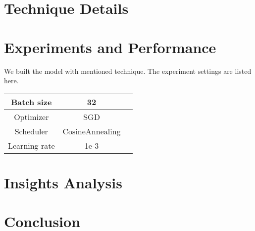 \documentclass[10pt,twocolumn,letterpaper]{article}
\begin{document}
\section{Technique Details}

\section{Experiments and Performance}

We built the model with mentioned technique.
The experiment settings are listed here.


\begin{table}[h]
   \begin{center}
   \begin{tabular}{|c|c| p{5cm}|}  
   \hline  
   Batch size & 32 \\
   \hline  
   Optimizer & SGD \\
   \hline  
   Scheduler & CosineAnnealing \\  
   \hline
   Learning rate & 1e-3 \\
   \hline
   \end{tabular}  
   \end{center}  
\end{table}

\section{Insights Analysis}

\section{Conclusion}

{\small


}
\end{document}
